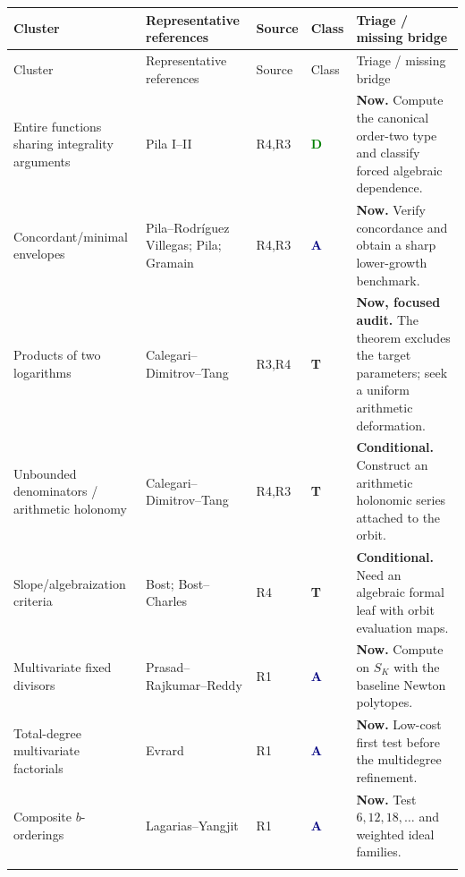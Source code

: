 \documentclass[10pt,letterpaper]{article}
\newcommand{\Rone}{\textsf{R1}}
\newcommand{\Rthree}{\textsf{R3}}
\newcommand{\Rfour}{\textsf{R4}}
\newcommand{\badgeDirect}{\textcolor{green}{\textbf{D}}}
\newcommand{\badgeAdapt}{\textcolor{navy}{\textbf{A}}}
\newcommand{\badgeTemplate}{\textcolor{amber}{\textbf{T}}}
\begin{document}
\begingroup
\scriptsize
\setlength{\LTleft}{0pt}
\setlength{\LTright}{0pt}
\setlength{\tabcolsep}{2.8pt}
\begin{longtable}{@{}L{0.225\textwidth}L{0.275\textwidth}C{0.08\textwidth}C{0.065\textwidth}L{0.30\textwidth}@{}}
\toprule
Cluster & Representative references & Source & Class & Triage / missing bridge\\
\midrule
\endfirsthead
\toprule
Cluster & Representative references & Source & Class & Triage / missing bridge\\
\midrule
\endhead
\bottomrule
\endfoot
Entire functions sharing integrality arguments & Pila I--II
\cite{PilaSharingI,PilaSharingII} & \Rfour,\Rthree & \badgeDirect & \textbf{Now.} Compute the
canonical order-two type and classify forced algebraic dependence.\\
\addlinespace
Concordant/minimal envelopes & Pila--Rodr\'iguez Villegas; Pila; Gramain
\cite{PilaRodriguezVillegas,PilaConcordant2002,Gramain1981} & \Rfour,\Rthree & \badgeAdapt &
\textbf{Now.} Verify concordance and obtain a sharp lower-growth benchmark.\\
\addlinespace
Products of two logarithms & Calegari--Dimitrov--Tang \cite{CDTProducts} &
\Rthree,\Rfour & \badgeTemplate & \textbf{Now, focused audit.} The theorem excludes the target
parameters; seek a uniform arithmetic deformation.\\
\addlinespace
Unbounded denominators / arithmetic holonomy & Calegari--Dimitrov--Tang
\cite{CDTUnbounded} & \Rfour,\Rthree & \badgeTemplate & \textbf{Conditional.} Construct an
arithmetic holonomic series attached to the orbit.\\
\addlinespace
Slope/algebraization criteria & Bost; Bost--Charles \cite{Bost2001,BostCharles} & \Rfour &
\badgeTemplate & \textbf{Conditional.} Need an algebraic formal leaf with orbit evaluation
maps.\\
\addlinespace
Multivariate fixed divisors & Prasad--Rajkumar--Reddy \cite{PrasadRajkumarReddy} & \Rone &
\badgeAdapt & \textbf{Now.} Compute on \(S_K\) with the baseline Newton polytopes.\\
\addlinespace
Total-degree multivariate factorials & Evrard \cite{Evrard2012} & \Rone & \badgeAdapt &
\textbf{Now.} Low-cost first test before the multidegree refinement.\\
\addlinespace
Composite \(b\)-orderings & Lagarias--Yangjit \cite{LagariasYangjit2024} & \Rone &
\badgeAdapt & \textbf{Now.} Test \(6,12,18,\ldots\) and weighted ideal families.\\
\addlinespace

\end{longtable}
\end{document}
